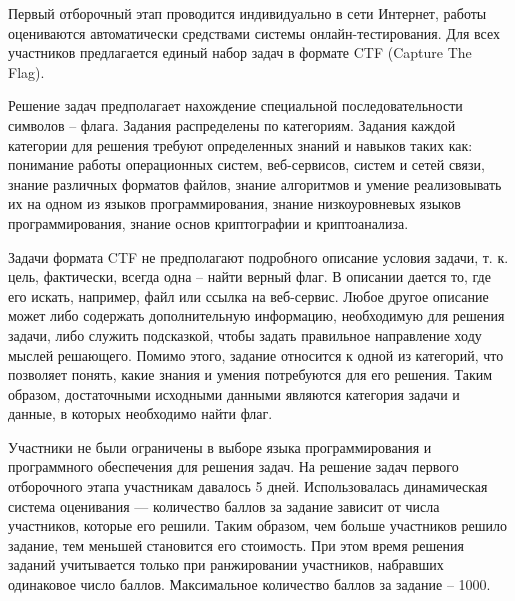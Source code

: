Первый отборочный этап проводится индивидуально в сети Интернет, работы оцениваются автоматически средствами системы онлайн-тестирования. Для всех \linebreak участников предлагается единый набор задач в формате CTF (Capture The Flag).

Решение задач предполагает нахождение специальной последовательности символов – флага. Задания распределены по категориям. Задания каждой категории для решения требуют определенных знаний и навыков таких как: понимание  работы операционных систем, веб-сервисов, систем и сетей связи, знание различных форматов файлов, знание алгоритмов и умение реализовывать их на одном из языков программирования, знание низкоуровневых языков программирования, знание основ криптографии и криптоанализа.

Задачи формата CTF не предполагают подробного описание условия задачи, т. к. цель, фактически, всегда одна – найти верный флаг. В описании дается то, где его искать, например, файл или ссылка на веб-сервис. Любое другое описание может либо содержать дополнительную информацию, необходимую для решения задачи, либо служить подсказкой, чтобы задать правильное направление ходу мыслей решающего. Помимо этого, задание относится к одной из категорий, что позволяет понять, какие знания и умения потребуются для его решения. Таким образом, достаточными исходными данными являются категория задачи и данные, в которых необходимо найти флаг.

Участники не были ограничены в выборе языка программирования и программного обеспечения для решения задач. На решение задач первого отборочного этапа участникам давалось 5 дней. Использовалась динамическая система оценивания — количество баллов за задание зависит от числа участников, которые его решили. Таким образом, чем больше участников решило задание, тем меньшей становится его стоимость. При этом время решения заданий учитывается только при ранжировании участников, набравших одинаковое число баллов. Максимальное количество баллов за задание – 1000.